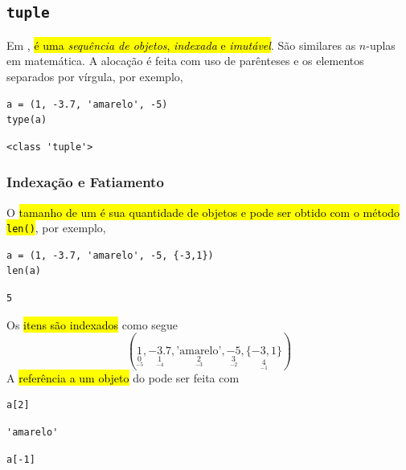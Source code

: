\subsection{\texttt{tuple}}

Em {\python}, \hl{{\PYTHONtuple} é uma \emph{sequência de objetos}, \emph{indexada} e \emph{imutável}}. São similares as $n$-uplas em matemática. A alocação é feita com uso de parênteses e os elementos separados por vírgula, por exemplo,

\begin{lstlisting}
a = (1, -3.7, 'amarelo', -5)
type(a)
\end{lstlisting}

\begin{verbatim}
<class 'tuple'>
\end{verbatim}

\subsubsection{Indexação e Fatiamento}

O \hl{tamanho de um {\PYTHONtuple} é sua quantidade de objetos e pode ser obtido com o método \texttt{len()}}, por exemplo,

\begin{lstlisting}
a = (1, -3.7, 'amarelo', -5, {-3,1})
len(a)
\end{lstlisting}

\begin{verbatim}
5
\end{verbatim}

Os \hl{itens são indexados} como segue
\begin{equation}
  (\underset{\underset{-5}{0}}{1}, \underset{\underset{-4}{1}}{-3.7}, \underset{\underset{-3}{2}}{\text{'amarelo'}}, \underset{\underset{-2}{3}}{-5}, \underset{\underset{-1}{4}}{\{-3, 1\}})
\end{equation}
A \hl{referência a um objeto} do {\PYTHONtuple} pode ser feita com

\begin{lstlisting}
a[2]
\end{lstlisting}

\begin{verbatim}
'amarelo'
\end{verbatim}

\begin{lstlisting}
a[-1]
\end{lstlisting}

